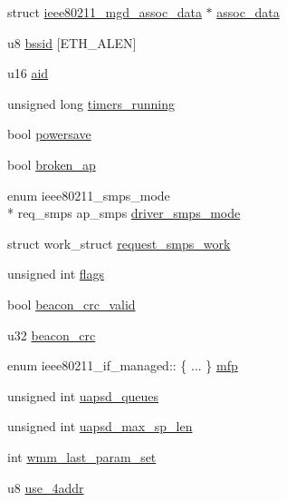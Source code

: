 \begin{DoxyCompactItemize}
struct \hyperlink{structieee80211__mgd__assoc__data}{ieee80211\-\_\-mgd\-\_\-assoc\-\_\-data} $\ast$ \hyperlink{structieee80211__if__managed_a33bf96711b0af50fb5ed9bbb3e912720}{assoc\-\_\-data}
\item 
u8 \hyperlink{structieee80211__if__managed_ace5f51b68bfe9b41dcc950f70a3e7119}{bssid} \mbox{[}E\-T\-H\-\_\-\-A\-L\-E\-N\mbox{]}
\item 
u16 \hyperlink{structieee80211__if__managed_a57f670786e3ff8b4229d4a3cb97a63a0}{aid}
\item 
unsigned long \hyperlink{structieee80211__if__managed_a17be34de946a3782a1daf2f20c1e913d}{timers\-\_\-running}
\item 
bool \hyperlink{structieee80211__if__managed_afbc3e052896051a278a5ad17f6a6e2bb}{powersave}
\item 
bool \hyperlink{structieee80211__if__managed_abce8e97c6b8128b3b66ae2ad3eb07461}{broken\-\_\-ap}
\item 
enum ieee80211\-\_\-smps\-\_\-mode \\*
req\-\_\-smps ap\-\_\-smps \hyperlink{structieee80211__if__managed_a898549726b20c8fd129d59974daf9c90}{driver\-\_\-smps\-\_\-mode}
\item 
struct work\-\_\-struct \hyperlink{structieee80211__if__managed_a8ca768ab965bec1f9e585a2297f9cb74}{request\-\_\-smps\-\_\-work}
\item 
unsigned int \hyperlink{structieee80211__if__managed_ac92588540e8c1d014a08cd8a45462b19}{flags}
\item 
bool \hyperlink{structieee80211__if__managed_a1fc669be36e8ebed0331683d749cd2be}{beacon\-\_\-crc\-\_\-valid}
\item 
u32 \hyperlink{structieee80211__if__managed_a1db4c143d90ecbedae3f9975d8bbb65f}{beacon\-\_\-crc}
\item 
enum ieee80211\-\_\-if\-\_\-managed\-:: \{ ... \}  \hyperlink{structieee80211__if__managed_a13655811e60ceec76eb1e1306eb515bc}{mfp}
\item 
unsigned int \hyperlink{structieee80211__if__managed_aae57668cf51c8e98a1238d7da802965d}{uapsd\-\_\-queues}
\item 
unsigned int \hyperlink{structieee80211__if__managed_a227154b39b6abc457693d962b19fd6c3}{uapsd\-\_\-max\-\_\-sp\-\_\-len}
\item 
int \hyperlink{structieee80211__if__managed_a5dd7a6f610fab30b1816d1a3f303da7e}{wmm\-\_\-last\-\_\-param\-\_\-set}
\item 
u8 \hyperlink{structieee80211__if__managed_a5c7e4a91e5f07e57a228e601b1cd4e29}{use\-\_\-4addr}

\end{DoxyCompactItemize}

